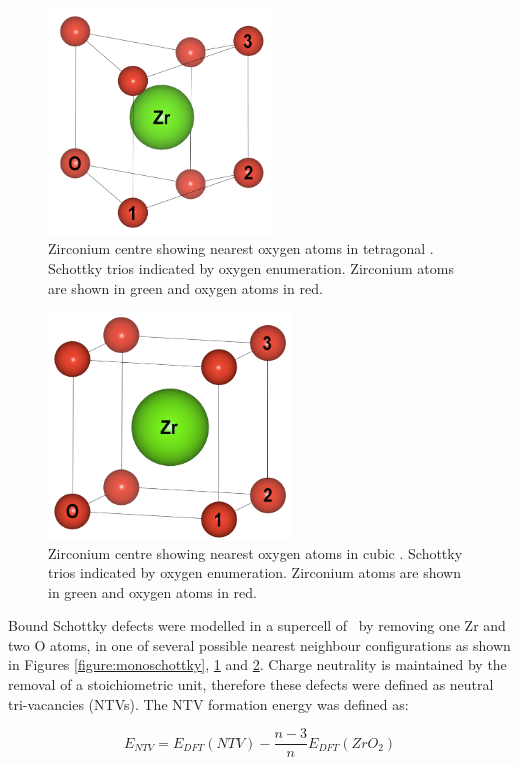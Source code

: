 \begin{figure}[htp] %
\centering
\includegraphics[height=6cm]{images/zr_centre_tet.png}
\caption{Zirconium centre showing nearest oxygen atoms in tetragonal \zirconia. Schottky trios indicated by oxygen enumeration. Zirconium atoms are shown in green and oxygen atoms in red.}
\label{figure:tetschottky}
\end{figure}

\begin{figure}[htp] %
\centering
\includegraphics[height=6cm]{images/sd_cubic_zro2.png}
\caption{Zirconium centre showing nearest oxygen atoms in cubic \zirconia. Schottky trios indicated by oxygen enumeration. Zirconium atoms are shown in green and oxygen atoms in red.}
\label{figure:cubicschottky}
\end{figure}

Bound Schottky defects were modelled in a supercell of \zirconia\ by removing one Zr and two O atoms, in one of several possible nearest neighbour configurations as shown in Figures \ref{figure:monoschottky}, \ref{figure:tetschottky} and \ref{figure:cubicschottky}. Charge neutrality is maintained by the removal of a stoichiometric unit, therefore these defects were defined as neutral tri-vacancies (NTVs). The NTV formation energy was defined as:

\begin{equation}
\label{equation_NTV}
E_{NTV} = E_{DFT}(NTV) - \frac{n-3}{n}E_{DFT}(ZrO_2)%
\end{equation}

